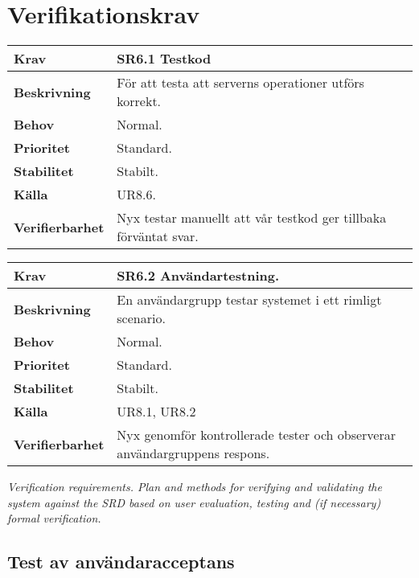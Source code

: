 \documentclass[a4paper, twoside, 11pt, titlepage]{article}
\begin{document}
\clearpage
\section{Verifikationskrav}


\begin{tabular} { p{2.6cm} p{12.5cm} }
	\hline
	\sffamily\textbf{Krav} & \sffamily\textbf{SR6.1 Testkod } \\
	\hline
	\sffamily\textbf{Beskrivning} &  För att testa att serverns operationer utförs korrekt.  \\
	\hline
	\sffamily\textbf{Behov} &  Normal.  \\
	\hline
	\sffamily\textbf{Prioritet} &  Standard.  \\
	\hline
	\sffamily\textbf{Stabilitet} &  Stabilt.  \\
	\hline
	\sffamily\textbf{Källa} &  UR8.6.  \\
	\hline
	\sffamily\textbf{Verifierbarhet} &  Nyx testar manuellt att vår testkod ger tillbaka förväntat svar.  \\
	\hline
\end{tabular}
\vspace{6mm}

\begin{tabular} { p{2.6cm} p{12.5cm} }
	\hline
	\sffamily\textbf{Krav} & \sffamily\textbf{SR6.2 Användartestning. } \\
	\hline
	\sffamily\textbf{Beskrivning} &  En användargrupp testar systemet i ett rimligt scenario.  \\
	\hline
	\sffamily\textbf{Behov} &  Normal.  \\
	\hline
	\sffamily\textbf{Prioritet} &  Standard.  \\
	\hline
	\sffamily\textbf{Stabilitet} &  Stabilt.  \\
	\hline
	\sffamily\textbf{Källa} &  UR8.1, UR8.2  \\
	\hline
	\sffamily\textbf{Verifierbarhet} &  Nyx genomför kontrollerade tester och observerar användargruppens respons.  \\
	\hline
\end{tabular}
\vspace{6mm}

\emph{Verification requirements. Plan and methods for verifying and validating the system against the SRD based on user evaluation, testing and (if necessary) formal verification.}

	\subsection{Test av användaracceptans}
\end{document}
